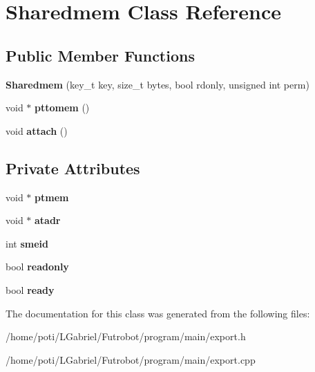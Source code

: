 \hypertarget{classSharedmem}{}\section{Sharedmem Class Reference}
\label{classSharedmem}
\subsection*{Public Member Functions}
\begin{DoxyCompactItemize}
\item 
{\bfseries Sharedmem} (key\+\_\+t key, size\+\_\+t bytes, bool rdonly, unsigned int perm)\hypertarget{classSharedmem_ae701d8acfaed3c37534783e9fdd11d18}{}\label{classSharedmem_ae701d8acfaed3c37534783e9fdd11d18}

\item 
void $\ast$ {\bfseries pttomem} ()\hypertarget{classSharedmem_a188098b154089f3ffca1dd64ea0bc89e}{}\label{classSharedmem_a188098b154089f3ffca1dd64ea0bc89e}

\item 
void {\bfseries attach} ()\hypertarget{classSharedmem_a249c71decd4089fc1c4bccebaa85f72d}{}\label{classSharedmem_a249c71decd4089fc1c4bccebaa85f72d}

\end{DoxyCompactItemize}
\subsection*{Private Attributes}
\begin{DoxyCompactItemize}
\item 
void $\ast$ {\bfseries ptmem}\hypertarget{classSharedmem_a3fdc55b1afe6a4dfb430820063fb334c}{}\label{classSharedmem_a3fdc55b1afe6a4dfb430820063fb334c}

\item 
void $\ast$ {\bfseries atadr}\hypertarget{classSharedmem_af32985fde796a92de38f9f75dc2c2ad7}{}\label{classSharedmem_af32985fde796a92de38f9f75dc2c2ad7}

\item 
int {\bfseries smeid}\hypertarget{classSharedmem_ae679ea3f2f68246d5d1ac1a576da930b}{}\label{classSharedmem_ae679ea3f2f68246d5d1ac1a576da930b}

\item 
bool {\bfseries readonly}\hypertarget{classSharedmem_a0d0ad473daa5906361deea340b150560}{}\label{classSharedmem_a0d0ad473daa5906361deea340b150560}

\item 
bool {\bfseries ready}\hypertarget{classSharedmem_aa247296e1594bc2701d8b6936e3077ae}{}\label{classSharedmem_aa247296e1594bc2701d8b6936e3077ae}

\end{DoxyCompactItemize}


The documentation for this class was generated from the following files\+:\begin{DoxyCompactItemize}
\item 
/home/poti/\+L\+Gabriel/\+Futrobot/program/main/export.\+h\item 
/home/poti/\+L\+Gabriel/\+Futrobot/program/main/export.\+cpp\end{DoxyCompactItemize}
